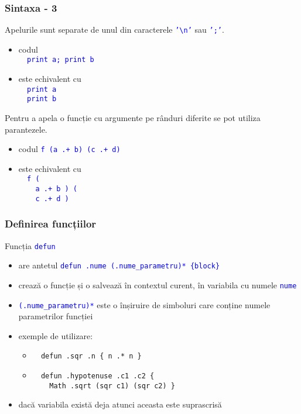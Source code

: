 \documentclass{beamer}
\renewcommand{\c}[1]{\textcolor{blue}{\texttt{#1}}}
\begin{document}
\begin{frame}[containsverbatim]
  \frametitle{Sintaxa - 3}
  Apelurile sunt separate de unul din caracterele \c{'\textbackslash n'} sau \c{';'}.
  \begin{itemize}
    \item 
      codul \\
      \c{\ \ print a; print b}
    \item 
      este echivalent cu \\
      \c{\ \ print a}\\
      \c{\ \ print b}
  \end{itemize}
  Pentru a apela o funcție cu argumente pe rânduri diferite se pot utiliza parantezele. 
\begin{itemize}
\item codul \c{f (a .+ b) (c .+ d)}
\item este echivalent cu\\
\c{\ \ f (}\\
\c{\ \ \ \ a .+ b ) (}\\
\c{\ \ \ \ c .+ d )}
\end{itemize}
\end{frame}

\begin{frame}[containsverbatim]
  \frametitle{Definirea funcțiilor}
  Funcția \c{defun}
  \begin{itemize}
    \item are antetul \c{defun .nume (.nume\_parametru)* \{block\}}
    \item crează o funcție și o salvează în contextul curent, în variabila cu numele \c{nume}
    \item \c{(.nume\_parametru)*} este o înșiruire de simboluri care conține numele parametrilor funcției
    \item exemple de utilizare:
      \begin{itemize}
      \item
        \color{blue}
        \begin{verbatim}
  defun .sqr .n { n .* n }\end{verbatim}
      \item
        \begin{verbatim}
  defun .hypotenuse .c1 .c2 { 
    Math .sqrt (sqr c1) (sqr c2) }\end{verbatim}
        \color{black}
      \end{itemize}
    \item dacă variabila există deja atunci aceasta este suprascrisă
  \end{itemize}
\end{frame}
\end{document}
